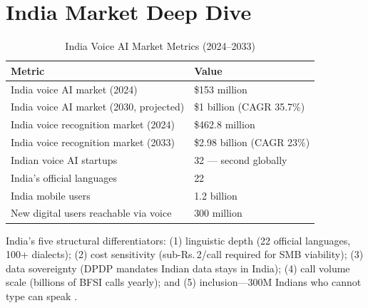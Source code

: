 \documentclass[12pt,a4paper]{article}
\begin{document}
\section{India Market Deep Dive}
\label{sec:india}

\begin{table}[H]\centering
\caption{India Voice AI Market Metrics (2024--2033)}
\label{tab:india-market}
\begin{tabularx}{\textwidth}{lX}
\toprule
\textbf{Metric} & \textbf{Value} \\
\midrule
India voice AI market (2024)            & \$153 million \\
India voice AI market (2030, projected) & \$1 billion (CAGR 35.7\%) \\
India voice recognition market (2024)   & \$462.8 million \\
India voice recognition market (2033)   & \$2.98 billion (CAGR 23\%) \\
Indian voice AI startups                & 32 --- second globally \\
India's official languages              & 22 \\
India mobile users                      & 1.2 billion \\
New digital users reachable via voice   & 300 million \\
\bottomrule
\end{tabularx}
\end{table}

India's five structural differentiators: (1) linguistic depth (22 official
languages, 100+ dialects); (2) cost sensitivity (sub-Rs.\,2/call required
for SMB viability); (3) data sovereignty (DPDP mandates Indian data stays
in India); (4) call volume scale (billions of BFSI calls yearly); and
(5) inclusion---300M Indians who cannot type can speak \cite{business-standard-india}.
\end{document}
